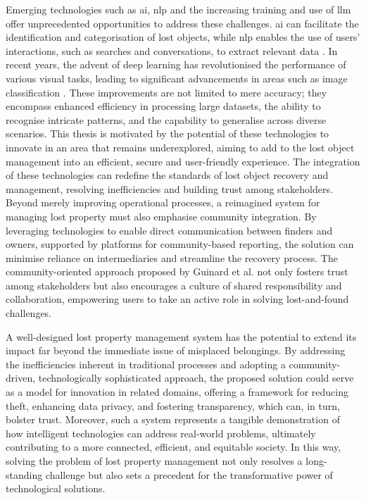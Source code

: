 Emerging technologies such as \ac{ai}, \ac{nlp} and the increasing training and use of \ac{llm} offer unprecedented opportunities to address these challenges.
\ac{ai} can facilitate the identification and categorisation of lost objects, while \ac{nlp} enables the use of users' interactions, such as searches and conversations, to extract relevant data \cite{Prawira2024}.
In recent years, the advent of deep learning has revolutionised the performance of various visual tasks, leading to significant advancements in areas such as image classification \cite{Liu2022}.
These improvements are not limited to mere accuracy; they encompass enhanced efficiency in processing large datasets, the ability to recognise intricate patterns, and the capability to generalise across diverse scenarios.
This thesis is motivated by the potential of these technologies to innovate in an area that remains underexplored, aiming to add to the lost object management into an efficient, secure and user-friendly experience.
The integration of these technologies can redefine the standards of lost object recovery and management, resolving inefficiencies and building trust among stakeholders.
Beyond merely improving operational processes, a reimagined system for managing lost property must also emphasise community integration.
By leveraging technologies to enable direct communication between finders and owners, supported by platforms for community-based reporting, the solution can minimise reliance on intermediaries and streamline the recovery process.
The community-oriented approach proposed by Guinard et al.
\cite{Guinard2008} not only fosters trust among stakeholders but also encourages a culture of shared responsibility and collaboration, empowering users to take an active role in solving lost-and-found challenges.

A well-designed lost property management system has the potential to extend its impact far beyond the immediate issue of misplaced belongings.
By addressing the inefficiencies inherent in traditional processes and adopting a community-driven, technologically sophisticated approach, the proposed solution could serve as a model for innovation in related domains, offering a framework for reducing theft, enhancing data privacy, and fostering transparency, which can, in turn, bolster trust.
Moreover, such a system represents a tangible demonstration of how intelligent technologies can address real-world problems, ultimately contributing to a more connected, efficient, and equitable society.
In this way, solving the problem of lost property management not only resolves a long-standing challenge but also sets a precedent for the transformative power of technological solutions.

